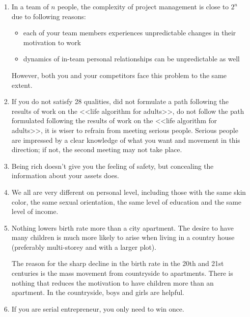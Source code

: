 \documentclass[11pt]{article}
\theoremstyle{remark}
\theoremstyle{definition}
\begin{document}
\begin{enumerate}
\item In a team of $n$ people, the complexity of project management is close to $2^n$ due to following reasons:
\begin{itemize}
\item each of your team members experiences unpredictable changes in their motivation to work
\item dynamics of in-team personal relationships can be unpredictable as well
\end{itemize}

However, both you and your competitors face this problem to the same extent.


\item If you do not satisfy 28 qualities, did not formulate a path following the results of work on the <<life algorithm for adults>>, do not follow the path formulated following the results of work on the <<life algorithm for adults>>, it is wiser to refrain from meeting serious people. Serious people are impressed by a clear knowledge of what you want and movement in this direction; if not, the second meeting may not take place.

\item Being rich doesn't give you the feeling of safety, but concealing the information about your assets does. 




\item We all are very different on personal level, including those with the same skin color, the same sexual orientation, the same level of education and the same level of income. 




\item Nothing lowers birth rate more than a city apartment. The desire to have many children is much more likely to arise when living in a country house (preferably multi-storey and with a larger plot).

The reason for the sharp decline in the birth rate in the 20th and 21st centuries is the mass movement from countryside to apartments. There is nothing that reduces the motivation to have children more than an apartment. In the countryside, boys and girls are helpful.


\item If you are serial entrepreneur, you only need to win once.


\end{enumerate}
\end{document}

